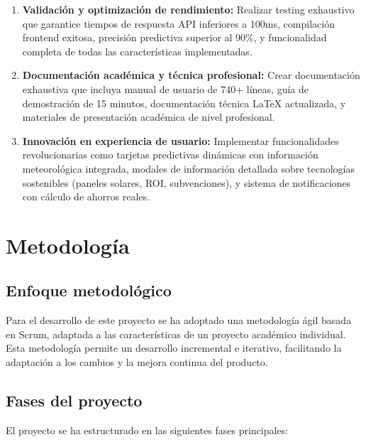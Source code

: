 \begin{enumerate}
    \item \textbf{Validación y optimización de rendimiento:} Realizar testing exhaustivo que garantice tiempos de respuesta API inferiores a 100ms, compilación frontend exitosa, precisión predictiva superior al 90\%, y funcionalidad completa de todas las características implementadas.
    
    \item \textbf{Documentación académica y técnica profesional:} Crear documentación exhaustiva que incluya manual de usuario de 740+ líneas, guía de demostración de 15 minutos, documentación técnica LaTeX actualizada, y materiales de presentación académica de nivel profesional.
    
    \item \textbf{Innovación en experiencia de usuario:} Implementar funcionalidades revolucionarias como tarjetas predictivas dinámicas con información meteorológica integrada, modales de información detallada sobre tecnologías sostenibles (paneles solares, ROI, subvenciones), y sistema de notificaciones con cálculo de ahorros reales.
\end{enumerate}

\section{Metodología}

\subsection{Enfoque metodológico}

Para el desarrollo de este proyecto se ha adoptado una metodología ágil basada en Scrum, adaptada a las características de un proyecto académico individual. Esta metodología permite un desarrollo incremental e iterativo, facilitando la adaptación a los cambios y la mejora continua del producto.

\subsection{Fases del proyecto}

El proyecto se ha estructurado en las siguientes fases principales:

